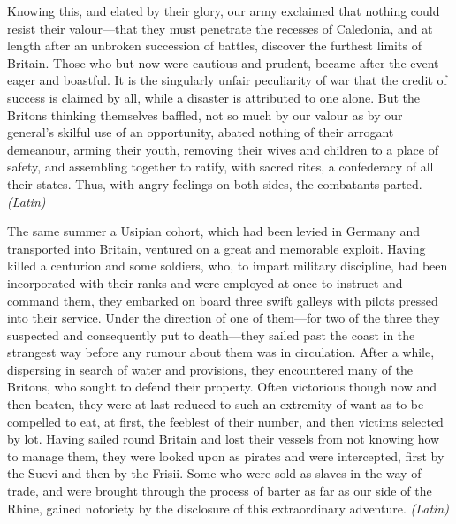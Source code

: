 
Knowing this, and elated by their glory, our army exclaimed that nothing could resist their valour—that they must penetrate the recesses of Caledonia, and at length after an unbroken succession of battles, discover the furthest limits of Britain. Those who but now were cautious and prudent, became after the event eager and boastful. It is the singularly unfair peculiarity of war that the credit of success is claimed by all, while a disaster is attributed to one alone. But the Britons thinking themselves baffled, not so much by our valour as by our general's skilful use of an opportunity, abated nothing of their arrogant demeanour, arming their youth, removing their wives and children to a place of safety, and assembling together to ratify, with sacred rites, a confederacy of all their states. Thus, with angry feelings on both sides, the combatants parted. \emph{(Latin)}


The same summer a Usipian cohort, which had been levied in Germany and transported into Britain, ventured on a great and memorable exploit. Having killed a centurion and some soldiers, who, to impart military discipline, had been incorporated with their ranks and were employed at once to instruct and command them, they embarked on board three swift galleys with pilots pressed into their service. Under the direction of one of them—for two of the three they suspected and consequently put to death—they sailed past the coast in the strangest way before any rumour about them was in circulation. After a while, dispersing in search of water and provisions, they encountered many of the Britons, who sought to defend their property. Often victorious though now and then beaten, they were at last reduced to such an extremity of want as to be compelled to eat, at first, the feeblest of their number, and then victims selected by lot. Having sailed round Britain and lost their vessels from not knowing how to manage them, they were looked upon as pirates and were intercepted, first by the Suevi and then by the Frisii. Some who were sold as slaves in the way of trade, and were brought through the process of barter as far as our side of the Rhine, gained notoriety by the disclosure of this extraordinary adventure. \emph{(Latin)}


